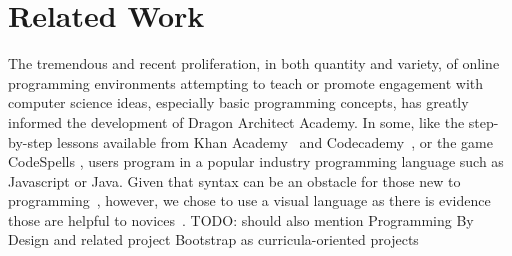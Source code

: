 \documentclass{sig-alternate}
\newcommand{\TODO}[1]{{\color{red} TODO: #1}}
\newcommand{\gametitle}{{\color{RoyalPurple} Dragon Architect Academy}}
\begin{document}



\section{Related Work}
The tremendous and recent proliferation, in both quantity and variety, of online programming environments attempting to teach or promote engagement with computer science ideas, especially basic programming concepts, has greatly informed the development of \gametitle{}. In some, like the step-by-step lessons available from Khan Academy~\cite{khanacademy} and Codecademy~\cite{codecademy}, or the game CodeSpells \cite{esper2013codespells}, users program in a popular industry programming language such as Javascript or Java. Given that syntax can be an obstacle for those new to programming~\cite{stefik2013syntax}, however, we chose to use a visual language as there is evidence those are helpful to novices~\cite{whitley1997visual}. \TODO{should also mention Programming By Design and related project Bootstrap as curricula-oriented projects}
\end{document}
